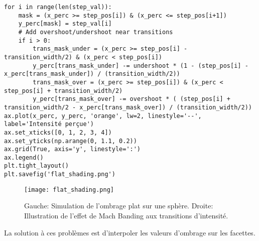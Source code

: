 \begin{verbatim}
for i in range(len(step_val)):
    mask = (x_perc >= step_pos[i]) & (x_perc <= step_pos[i+1])
    y_perc[mask] = step_val[i]
    # Add overshoot/undershoot near transitions
    if i > 0:
        trans_mask_under = (x_perc >= step_pos[i] - transition_width/2) & (x_perc < step_pos[i])
        y_perc[trans_mask_under] -= undershoot * (1 - (step_pos[i] - x_perc[trans_mask_under]) / (transition_width/2))
        trans_mask_over = (x_perc >= step_pos[i]) & (x_perc < step_pos[i] + transition_width/2)
        y_perc[trans_mask_over] -= overshoot * ( (step_pos[i] + transition_width/2 - x_perc[trans_mask_over]) / (transition_width/2))
ax.plot(x_perc, y_perc, 'orange', lw=2, linestyle='--', label='Intensité perçue')
ax.set_xticks([0, 1, 2, 3, 4])
ax.set_yticks(np.arange(0, 1.1, 0.2))
ax.grid(True, axis='y', linestyle=':')
ax.legend()
plt.tight_layout()
plt.savefig('flat_shading.png')
\end{verbatim}
\begin{figure}[H]
\centering
\texttt{[image: flat\_shading.png]}
\caption{Gauche: Simulation de l'ombrage plat sur une sphère. Droite: Illustration de l'effet de Mach Banding aux transitions d'intensité.}
\label{fig:flat_shading}
\end{figure}
La solution à ces problèmes est d'interpoler les valeurs d'ombrage sur les facettes.

